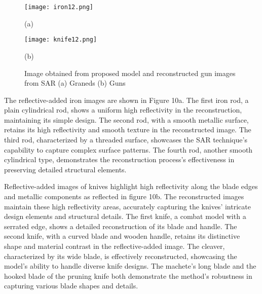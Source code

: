 \documentclass[journal,article,submit,pdftex,moreauthors]{Definitions/mdpi}
\begin{document}
\begin{figure}[h]
    \centering
    \begin{minipage}{0.49\textwidth}
        \centering
        \texttt{[image: iron12.png]}
        \caption*{(a)}
    \end{minipage}
    \hfill
    \begin{minipage}{0.49\textwidth}
        \centering
        \texttt{[image: knife12.png]}
        \caption*{(b)}
    \end{minipage}
    \caption{Image obtained from proposed model and reconstructed gun images from SAR (a) Graneds    (b) Guns}
    \label{fig:side_by_side}
\end{figure}

















The reflective-added iron images are shown in Figure 10a. The first iron rod, a plain cylindrical rod, shows a uniform high reflectivity in the reconstruction, maintaining its simple design. The second rod, with a smooth metallic surface, retains its high reflectivity and smooth texture in the reconstructed image. The third rod, characterized by a threaded surface, showcases the SAR technique's capability to capture complex surface patterns. The fourth rod, another smooth cylindrical type, demonstrates the reconstruction process's effectiveness in preserving detailed structural elements.



Reflective-added images of knives highlight high reflectivity along the blade edges and metallic components as reflected in figure 10b. The reconstructed images maintain these high reflectivity areas, accurately capturing the knives' intricate design elements and structural details. The first knife, a combat model with a serrated edge, shows a detailed reconstruction of its blade and handle. The second knife, with a curved blade and wooden handle, retains its distinctive shape and material contrast in the reflective-added image. The cleaver, characterized by its wide blade, is effectively reconstructed, showcasing the model's ability to handle diverse knife designs. The machete's long blade and the hooked blade of the pruning knife both demonstrate the method's robustness in capturing various blade shapes and details.
\end{document}
